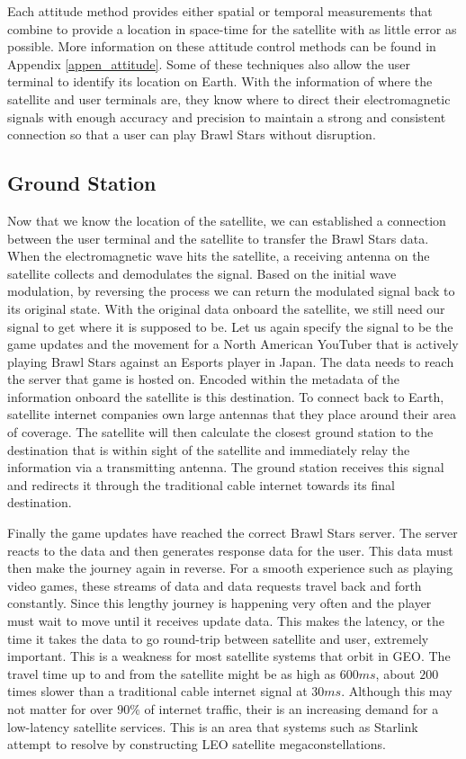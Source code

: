 \documentclass[10pt]{article}
\begin{document}
Each attitude method provides either spatial or temporal measurements that combine to provide a location in space-time for the satellite with as little error as possible. More information on these attitude control methods can be found in Appendix \ref{appen_attitude}. Some of these techniques also allow the user terminal to identify its location on Earth. With the information of where the satellite and user terminals are, they know where to direct their electromagnetic signals with enough accuracy and precision to maintain a strong and consistent connection so that a user can play Brawl Stars without disruption. 

\subsection{Ground Station}
\label{ground}

Now that we know the location of the satellite, we can established a connection between the user terminal and the satellite to transfer the Brawl Stars data. When the electromagnetic wave hits the satellite, a receiving antenna on the satellite collects and demodulates the signal. Based on the initial wave modulation, by reversing the process we can return the modulated signal back to its original state. With the original data onboard the satellite, we still need our signal to get where it is supposed to be. Let us again specify the signal to be the game updates and the movement for a North American YouTuber that is actively playing Brawl Stars against an Esports player in Japan. The data needs to reach the server that game is hosted on. Encoded within the metadata of the information onboard the satellite is this destination. To connect back to Earth, satellite internet companies own large antennas that they place around their area of coverage. The satellite will then calculate the closest ground station to the destination that is within sight of the satellite and immediately relay the information via a transmitting antenna. The ground station receives this signal and redirects it through the traditional cable internet towards its final destination. 

Finally the game updates have reached the correct Brawl Stars server. The server reacts to the data and then generates response data for the user. This data must then make the journey again in reverse. For a smooth experience such as playing video games, these streams of data and data requests travel back and forth constantly. Since this lengthy journey is happening very often and the player must wait to move until it receives update data. This makes the latency, or the time it takes the data to go round-trip between satellite and user, extremely important. This is a weakness for most satellite systems that orbit in GEO. The travel time up to and from the satellite might be as high as $600\si{ms}$, about $200$ times slower than a traditional cable internet signal at $30\si{ms}$. Although this may not matter for over $90\%$ of internet traffic, their is an increasing demand for a low-latency satellite services\cite{Satellite_internet_latency_2021}. This is an area that systems such as Starlink attempt to resolve by constructing LEO satellite megaconstellations. 
\end{document}
